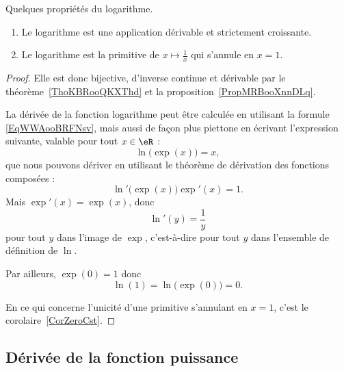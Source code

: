 	\begin{proposition}\label{ExZLMooMzYqfK}
		Quelques propriétés du logarithme.
		\begin{enumerate}
			\item
			      Le logarithme est une application dérivable et strictement croissante.
			\item
			      Le logarithme est la primitive de \( x\mapsto\frac{1}{ x }\) qui s'annule en \( x=1\).
		\end{enumerate}
	\end{proposition}

	\begin{proof}
		Elle est donc bijective, d'inverse continue et dérivable par le théorème~\ref{ThoKBRooQKXThd} et la proposition~\ref{PropMRBooXnnDLq}.

		La dérivée de la fonction logarithme peut être calculée en utilisant la formule \eqref{EqWWAooBRFNsv}, mais aussi de façon plus piettone en écrivant l'expression suivante, valable pour tout \( x\in \eR\) :
		\begin{equation}
			\ln\big( \exp(x) \big)=x,
		\end{equation}
		que nous pouvons dériver en utilisant le théorème de dérivation des fonctions composées :
		\begin{equation}
			\ln'\big( \exp(x) \big)\exp'(x)=1.
		\end{equation}
		Mais \( \exp'(x)=\exp(x)\), donc
		\begin{equation}
			\ln'(y)=\frac{1}{ y }
		\end{equation}
		pour tout \( y\) dans l'image de \( \exp\), c'est-à-dire pour tout \( y\) dans l'ensemble de définition de \( \ln\).

		Par ailleurs, \( \exp(0)=1\) donc
		\begin{equation}
			\ln(1)=\ln\big( \exp(0) \big)=0.
		\end{equation}

		En ce qui concerne l'unicité d'une primitive s'annulant en \( x=1\), c'est le corolaire~\ref{CorZeroCst}.
	\end{proof}

	\subsection{Dérivée de la fonction puissance}

